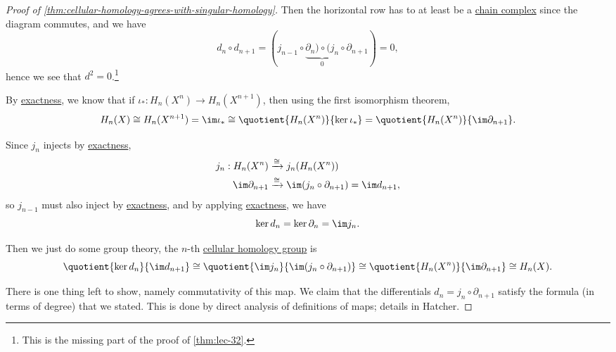 \begin{proof}[Proof of \autoref{thm:cellular-homology-agrees-with-singular-homology}]
	Then the horizontal row has to at least be a \hyperref[def:chain-complex]{chain complex} since the diagram commutes, and we have
	\[
		d_{n} \circ d_{n+1}  = (j_{n - 1} \circ \underbrace{\partial_n) \circ (j_n}_{0} \circ \partial_{n + 1}) = 0,
	\]
	hence we see that \(d^{2} = 0\).\footnote{This is the missing part of the proof of \autoref{thm:lec-32}.}

	By \hyperref[def:exact]{exactness}, we know that if \(\iota_\ast \colon H_n(X^n) \to H_n(X^{n + 1})\), then using the first isomorphism theorem,
	\[
		H_n(X) \cong H_n(X^{n + 1}) = \im \iota_\ast \cong  \quotient{H_n(X^n)}{\ker \iota_\ast} = \quotient{H_n(X^n)}{\im \partial_{n + 1}}.
	\]

	Since \(j_n\) injects by \hyperref[def:exact]{exactness},
	\begin{align*}
		j_n : H_n(X^n)       & \xrightarrow{\cong} j_n(H_n(X^n))                                     \\
		\im \partial_{n + 1} & \xrightarrow{\cong} \im (j_n \circ \partial_{n + 1}) = \im d_{n + 1},
	\end{align*}
	so \(j_{n - 1}\) must also inject by \hyperref[def:exact]{exactness}, and by applying \hyperref[def:exact]{exactness}, we have
	\[
		\ker d_n = \ker \partial_n = \im j_n.
	\]

	Then we just do some group theory, the \(n\)-th \hyperref[def:cellular-homology-group]{cellular homology group} is
	\[
		\quotient{\ker d_n}{\im d_{n + 1}} \cong \quotient{\im j_n}{\im (j_n \circ \partial_{n + 1})} \cong \quotient{H_n(X^n)}{\im \partial_{n + 1}} \cong H_n(X).
	\]

	There is one thing left to show, namely commutativity of this map. We claim that the differentials \(d_n = j_n \circ \partial_{n + 1}\)
	satisfy the formula (in terms of degree) that we stated. This is done by direct analysis of definitions of maps; details in Hatcher\cite{hatcher2002algebraic}.
\end{proof}
